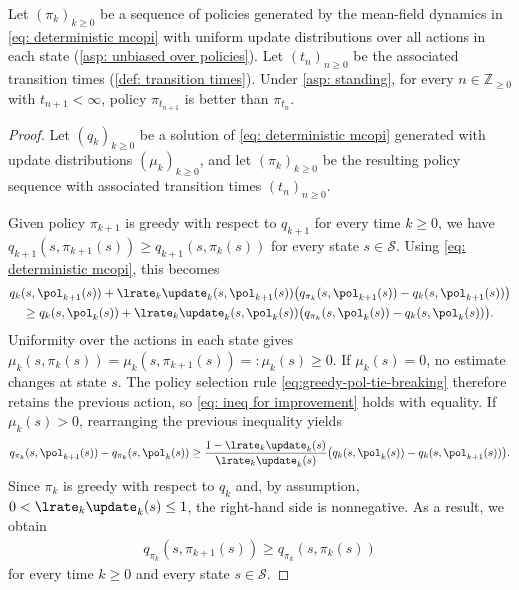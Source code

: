 \begin{proposition}
\label{thm: improving policies}
Let \((\pi_k)_{k\ge 0}\) be a sequence of policies generated by the mean-field dynamics in \eqref{eq: deterministic mcopi}
with uniform update distributions over all actions in each state (\autoref{asp: unbiased over policies}).
Let \((t_n)_{n\ge 0}\) be the associated transition times (\autoref{def: transition times}).
Under \autoref{asp: standing},
for every \(n \in \mathbb Z_{\ge 0}\) with \(t_{n+1}<\infty\), policy
\(\pi_{t_{n+1}}\) is better than \(\pi_{t_n}\).
\end{proposition}
\begin{proof}
Let $(q_k)_{k \ge 0}$ be a solution of \eqref{eq: deterministic mcopi} generated with update distributions $(\mu_k)_{k \ge 0}$, and let $(\pi_k)_{k \ge 0}$ be the resulting policy sequence with associated transition times $(t_n)_{n \ge 0}$.

Given policy $\pi_{k+1}$ is greedy with respect to $q_{k+1}$ for every time $k \ge 0$, we have $q_{k+1}(s,\pi_{k+1}(s)) \ge q_{k+1}(s, \pi_k(s))$ for every state $s \in \mathcal S$.
Using \eqref{eq: deterministic mcopi}, this becomes
\begin{multline*}
    q_k(s, \pol_{k+1}(s)) + \lrate_k \update_k(s, \pol_{k+1}(s)) \big( q_{\pi_k}(s, \pol_{k+1}(s)) - q_k(s, \pol_{k+1}(s)) \big)
    \\
    \ge
    q_k(s, \pol_k(s)) + \lrate_k \update_k(s, \pol_k(s)) \big( q_{\pi_k}(s, \pol_k(s)) - q_k(s, \pol_k(s)) \big) .
\end{multline*}
Uniformity over the actions in each state gives
$\mu_k(s,\pi_k(s))=\mu_k(s,\pi_{k+1}(s))=:\mu_k(s)\ge0$.
If $\mu_k(s)=0$, no estimate changes at state $s$. The policy selection rule \eqref{eq:greedy-pol-tie-breaking} therefore retains the previous action, so \eqref{eq: ineq for improvement} holds with equality.
If $\mu_k(s)>0$, rearranging the previous inequality yields
\begin{align*}
    q_{\pi_k}(s, \pol_{k+1}(s)) - q_{\pi_k}(s, \pol_k(s))
    \ge
    \dfrac{1 - \lrate_k \update_k(s)}{\lrate_k \update_k(s)} \big( q_k(s, \pol_k(s)) - q_k(s, \pol_{k+1}(s)) \big) .
\end{align*}
Since $\pi_k$ is greedy with respect to $q_k$ and, by assumption, $0 < \lrate_k \update_k(s) \le 1$, the right-hand side is nonnegative. As a result, we obtain
\begin{align}
\label{eq: ineq for improvement}
    q_{\pi_k}(s, \pi_{k+1}(s)) \ge q_{\pi_k}(s, \pi_k(s))
\end{align}
for every time $k \ge 0$ and every state $s \in \mathcal S$.


\end{proof}
